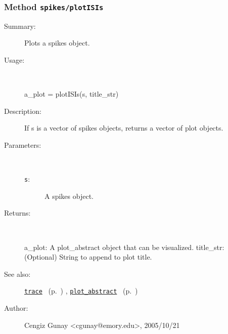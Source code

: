 \subsubsection[Method \texttt{plotISIs}]{Method \texttt{spikes/plotISIs}}%
%
\label{ref_spikes__plotISIs}%
\hypertarget{ref_spikes__plotISIs}{}%
\begin{description}
\item[Summary:]Plots a spikes object.
%
\item[Usage:]~%
\begin{lyxcode}%
a\_plot = plotISIs(s, title\_str)
%
\end{lyxcode}%
%
\item[Description:]%
If s is a vector of spikes objects, returns a vector of plot objects.
\item[Parameters:]~
\begin{description}%
\item[\texttt{s}:]
 A spikes object.
\end{description}%
%
\item[Returns:]~

	a\_plot: A plot\_abstract object that can be visualized.
	title\_str: (Optional) String to append to plot title.
%
%
\item[See also:]%
\hyperlink{ref_trace}{\texttt{trace}}%
\ (p.~\pageref{ref_trace})%
%
, \hyperlink{ref_plot_abstract}{\texttt{plot\_abstract}}%
\ (p.~\pageref{ref_plot_abstract})%
%
%
\item[Author:]%
Cengiz Gunay <cgunay@emory.edu>, 2005/10/21%
\end{description}
\methodline%
